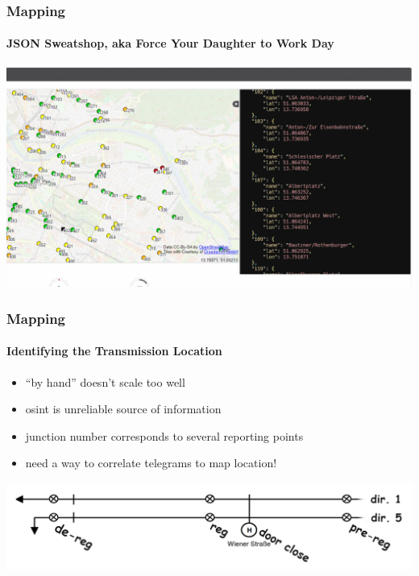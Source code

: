 \begin{frame}
  \frametitle{Mapping}
  \framesubtitle{JSON Sweatshop, aka Force Your Daughter to Work Day}
  \centering
  \includegraphics[width=.8\textwidth]{./figs/urbic-osint-json.png}
\end{frame}

\begin{frame}
  \frametitle{Mapping}
  \framesubtitle{Identifying the Transmission Location}
    \begin{itemize}
      \item ``by hand'' doesn't scale too well
      \item osint is unreliable source of information
      \item junction number corresponds to several reporting points
      \item need a way to correlate telegrams to map location!
    \end{itemize}
    \vspace{20pt}
    \includegraphics[width=\columnwidth]{./figs/moar_points.png}
\end{frame}

